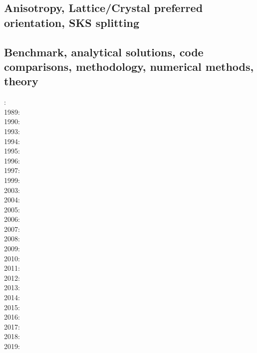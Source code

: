 \subsection{Anisotropy, Lattice/Crystal preferred orientation, SKS splitting}

\cite{faca13}
\cite{facc14}

\subsection*{Benchmark, analytical solutions, code comparisons, methodology, numerical methods, theory}

: \cite{yusa84}\\
1989: \cite{blbc89}\\
1990: \cite{trab90}\\
1993: \cite{leka93}\\
1994: \cite{brsa94}\\
1995: \cite{brsa95}\cite{moso95}\cite{full95}\\
1996: \cite{zhon96}\cite{mozg96}\\
1997: \cite{rist97}\\
1999: \cite{lind99}\\
2003: \cite{taki03}\cite{modm03}\cite{geyu03}\\
2004: \cite{kaps04}\cite{kasa04}\cite{kaks08}\\
2005: \cite{mure05}\\
2006: \cite{kapo06}\cite{more06}\\
2007: \cite{toma07}\cite{chcc07}\cite{kabe07}\cite{kaks07}\cite{moql07}\cite{geyu07}\\
2008: \cite{zhmt08}\cite{deka08}\cite{trub08}\cite{krdp08}\cite{mamo08}\cite{gepd98}\cite{vack08}\\
2009: \cite{king09}\cite{geum09}\\
2010: \cite{kaus10}\cite{kamm10}\cite{egat10}\cite{kilv10}\\
2011: \cite{dumg11}\cite{uibb11}\cite{hegc11}\\
2012: \cite{crsg12}\cite{chgv12}\cite{krwd12}\cite{may12}\cite{gerb12}\\
2013: \cite{chtl13}\cite{kemk13}\cite{gemd13}\\
2014: \cite{thmk14}\cite{mabl14}\\
2015: \cite{lelk15}\cite{rumi15}\cite{chpe15}\cite{mabl15}\\
2016: \cite{dumy16}\cite{blmp16}\\
2017: \cite{robh17}\cite{wisv17}\cite{majc17}\\
2018: \cite{memm18}\\
2019: \cite{clhe19}\cite{liki19}\cite{demh19}

